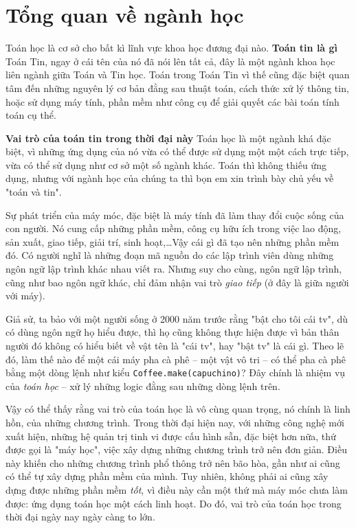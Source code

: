 \documentclass[14pt]{extarticle}
\begin{document}
\section{Tổng quan về ngành học}
Toán học là cơ sở cho bất kì lĩnh vực khoa học đương đại nào.
\textbf{Toán tin là gì}
Toán Tin, ngay ở cái tên của nó đã nói lên tất cả, đây là một ngành khoa học liên ngành giữa Toán và Tin học. Toán trong Toán Tin vì thế cũng đặc biệt quan tâm đến những nguyên lý cơ bản đằng sau thuật toán, cách thức xử lý thông tin, hoặc sử dụng máy tính, phần mềm như công cụ để giải quyết các bài toán tính toán cụ thể.

\textbf{Vai trò của toán tin trong thời đại này}
Toán học là một ngành khá đặc biệt, vì những ứng dụng của nó vừa có thể được sử dụng một một cách trực tiếp, vừa có thể sử dụng như cơ sở một số ngành khác. Toán thì không thiếu ứng dụng, nhưng với ngành học của chúng ta thì bọn em xin trình bày chủ yếu về "toán và tin".

Sự phát triển của máy móc, đặc biệt là máy tính đã làm thay đổi cuộc sống của con người. Nó cung cấp những phần mềm, công cụ hữu ích trong việc lao động, sản xuất, giao tiếp, giải trí, sinh hoạt,\ldots Vậy cái gì đã tạo nên những phần mềm đó. Có người nghĩ là những đoạn mã nguồn do các lập trình viên dùng những ngôn ngữ lập trình khác nhau viết ra. Nhưng suy cho cùng, ngôn ngữ lập trình, cũng như bao ngôn ngữ khác, chỉ đảm nhận vai trò \textit{giao tiếp} (ở đây là giữa người với máy).

Giả sử, ta bảo với một người sống ở 2000 năm trước rằng "bật cho tôi cái tv", dù có dùng ngôn ngữ họ hiểu được, thì họ cũng không thực hiện được vì bản thân người đó không có hiểu biết về vật tên là "cái tv", hay "bật tv" là cái gì. Theo lẽ đó, làm thế nào để một cái máy pha cà phê -- một vật vô tri -- có thể pha cà phê bằng một dòng lệnh như kiểu \texttt{Coffee.make(capuchino)}? Đây chính là nhiệm vụ của \textit{toán học} -- xử lý những logic đằng sau những dòng lệnh trên. 

Vậy có thể thấy rằng vai trò của toán học là vô cùng quan trọng, nó chính là linh hồn, của những chương trình. Trong thời đại hiện nay, với những công nghệ mới xuất hiện, những hệ quản trị tinh vi được cấu hình sẵn, đặc biệt hơn nữa, thứ được gọi là "máy học", việc xây dựng những chương trình trở nên đơn giản. Điều này khiến cho những chương trình phổ thông trở nên bão hòa, gần như ai cũng có thể tự xây dựng phần mềm của mình. Tuy nhiên, không phải ai cũng xây dựng được những phần mềm \textit{tốt}, vì điều này cần một thứ mà máy móc chưa làm được: ứng dụng toán học một cách linh hoạt. Do đó, vai trò của toán học trong thời đại ngày nay ngày càng to lớn. 
\end{document}
